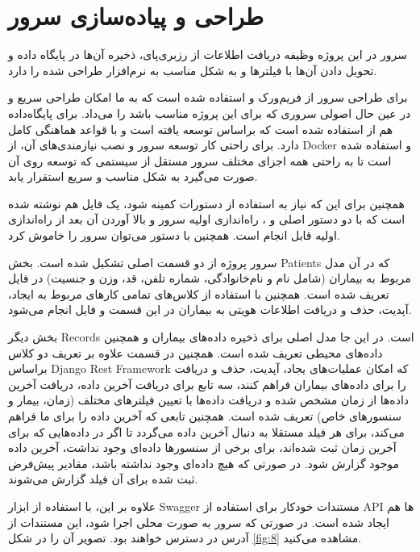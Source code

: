 
\section{طراحی و پیاده‌سازی سرور}

سرور در این پروژه وظیفه دریافت اطلاعات از رزبری‌پای،‌ ذخیره آن‌ها در پایگاه داده و تحویل دادن آن‌ها با فیلترها و به شکل مناسب به نرم‌افزار طراحی شده را دارد.

برای طراحی سرور از فریم‌ورک  و  استفاده شده است که به ما امکان طراحی سریع و در عین حال اصولی  سروری که برای این پروژه مناسب باشد را می‌داد. برای پایگاه‌داده هم از  استفاده شده است که براساس  توسعه یافته است و با قواعد  هماهنگی کامل دارد. برای راحتی کار توسعه سرور و نصب نیازمندی‌های آن، از Docker و  استفاده شده است تا به راحتی همه اجزای مختلف سرور مستقل از سیستمی که توسعه روی آن صورت می‌گیرد به شکل مناسب و سریع استقرار یابد.

\lr{}همچنین برای این که نیاز به استفاده از دستورات  کمینه شود، یک فایل   هم نوشته شده است که با دو دستور اصلی  و ، راه‌اندازی اولیه سرور و بالا آوردن آن بعد از راه‌اندازی اولیه قابل انجام است. همچنین با دستور  می‌توان سرور را خاموش کرد.



سرور پروژه از دو قسمت اصلی تشکیل شده است. بخش Patients که در آن مدل مربوط به بیماران (شامل نام و نام‌خانوادگی،‌ شماره تلفن، قد، وزن و جنسیت) در فایل  تعریف شده است. همچنین با استفاده از کلاس‌های  تمامی کار‌های مربوط به ایجاد، آپدیت، حذف و دریافت اطلاعات هویتی به بیماران در این قسمت و فایل  انجام می‌شود.

بخش دیگر Records است. در این جا مدل اصلی برای ذخیره داده‌های بیماران و همچنین داده‌های محیطی تعریف شده است. همچنین در قسمت  علاوه بر تعریف دو کلاس براساس Django Rest Framework که امکان عملیات‌های یجاد، آپدیت، حذف و دریافت را برای داده‌های بیماران فراهم کنند، سه تابع برای دریافت آخرین داده، دریافت آخرین داده‌ها از زمان مشخص شده و دریافت داده‌ها با تعیین فیلتر‌های مختلف (زمان، بیمار و سنسورهای خاص) تعریف شده است. همچنین تابعی که آخرین داده را برای ما فراهم می‌کند، برای هر فیلد مستقلا به دنبال آخرین داده می‌گردد تا اگر در داده‌هایی که برای آخرین زمان ثبت شده‌اند، برای برخی از سنسورها داده‌ای وجود نداشت، آخرین داده موجود گزارش شود. در صورتی که هیچ داده‌ای وجود نداشته باشد، مقادیر پیش‌فرض ثبت شده برای آن فیلد گزارش می‌شوند.

علاوه بر این، با استفاده از ابزار Swagger مستندات خودکار برای استفاده از API ها هم ایجاد شده است. در صورتی که سرور به صورت محلی اجرا شود، این مستندات از آدرس
در دسترس خواهند بود.
 تصویر آن را در شکل \ref{fig:8}
مشاهده می‌کنید.


